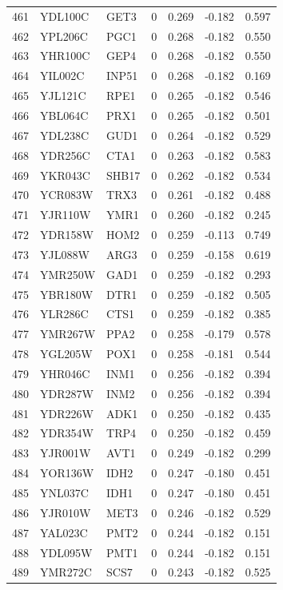 \begin{longtable}{rllrrrr}
461 & YDL100C & GET3 & 0 & 0.269 & -0.182 & 0.597\\
462 & YPL206C & PGC1 & 0 & 0.268 & -0.182 & 0.550\\
463 & YHR100C & GEP4 & 0 & 0.268 & -0.182 & 0.550\\
464 & YIL002C & INP51 & 0 & 0.268 & -0.182 & 0.169\\
465 & YJL121C & RPE1 & 0 & 0.265 & -0.182 & 0.546\\
466 & YBL064C & PRX1 & 0 & 0.265 & -0.182 & 0.501\\
467 & YDL238C & GUD1 & 0 & 0.264 & -0.182 & 0.529\\
468 & YDR256C & CTA1 & 0 & 0.263 & -0.182 & 0.583\\
469 & YKR043C & SHB17 & 0 & 0.262 & -0.182 & 0.534\\
470 & YCR083W & TRX3 & 0 & 0.261 & -0.182 & 0.488\\
471 & YJR110W & YMR1 & 0 & 0.260 & -0.182 & 0.245\\
472 & YDR158W & HOM2 & 0 & 0.259 & -0.113 & 0.749\\
473 & YJL088W & ARG3 & 0 & 0.259 & -0.158 & 0.619\\
474 & YMR250W & GAD1 & 0 & 0.259 & -0.182 & 0.293\\
475 & YBR180W & DTR1 & 0 & 0.259 & -0.182 & 0.505\\
476 & YLR286C & CTS1 & 0 & 0.259 & -0.182 & 0.385\\
477 & YMR267W & PPA2 & 0 & 0.258 & -0.179 & 0.578\\
478 & YGL205W & POX1 & 0 & 0.258 & -0.181 & 0.544\\
479 & YHR046C & INM1 & 0 & 0.256 & -0.182 & 0.394\\
480 & YDR287W & INM2 & 0 & 0.256 & -0.182 & 0.394\\
481 & YDR226W & ADK1 & 0 & 0.250 & -0.182 & 0.435\\
482 & YDR354W & TRP4 & 0 & 0.250 & -0.182 & 0.459\\
483 & YJR001W & AVT1 & 0 & 0.249 & -0.182 & 0.299\\
484 & YOR136W & IDH2 & 0 & 0.247 & -0.180 & 0.451\\
485 & YNL037C & IDH1 & 0 & 0.247 & -0.180 & 0.451\\
486 & YJR010W & MET3 & 0 & 0.246 & -0.182 & 0.529\\
487 & YAL023C & PMT2 & 0 & 0.244 & -0.182 & 0.151\\
488 & YDL095W & PMT1 & 0 & 0.244 & -0.182 & 0.151\\
489 & YMR272C & SCS7 & 0 & 0.243 & -0.182 & 0.525\\

\end{longtable}
